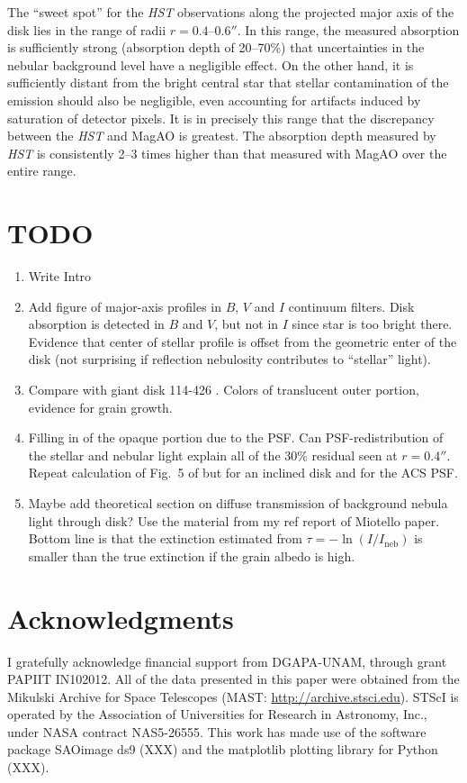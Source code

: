 \documentclass[oneside, 11pt]{article}
\begin{document}
The ``sweet spot'' for the \textit{HST} observations along the projected major axis of the disk lies in the range of radii \(r = 0.4\)--\(0.6''\).  In this range, the measured absorption is sufficiently strong (absorption depth of 20--70\%) that uncertainties in the nebular background level have a negligible effect.  On the other hand, it is sufficiently distant from the bright central star that stellar contamination of the emission should also be negligible, even accounting for artifacts induced by saturation of detector pixels.   It is in precisely this range that the discrepancy between the \textit{HST} and \hbox{MagAO} is greatest.  The absorption depth measured by \textit{HST} is consistently 2--3 times higher than that measured with MagAO over the entire range. 


\section*{TODO}
\label{sec:todo}

\begin{enumerate}
\item Write Intro
\item Add figure of major-axis profiles in \(B\), \(V\) and \(I\) continuum filters.  Disk absorption is detected in \(B\) and \(V\), but not in \(I\) since star is too bright there.  Evidence that center of stellar profile is offset from the geometric enter of the disk  (not surprising if reflection nebulosity contributes to ``stellar'' light). 
\item Compare with giant disk 114-426 \citep{2003ApJ...587L.109S, Miotello:2012a}.  Colors of translucent outer portion, evidence for grain growth. 
\item Filling in of the opaque portion due to the PSF.  Can PSF-redistribution of the stellar and nebular light explain all of the 30\% residual seen at \(r = 0.4''\).  Repeat calculation of Fig.~5 of \citeauthor{McCaughrean:1996a} but for an inclined disk and for the ACS PSF. 
\item Maybe add theoretical section on diffuse transmission of background nebula light through disk?   Use the material from my ref report of Miotello paper.  Bottom line is that the extinction estimated from \(\tau = - \ln (I / I_\mathrm{neb}) \) is smaller than the true extinction if the grain albedo is high. 
\end{enumerate}

\section*{Acknowledgments}
\label{sec:ack}
I gratefully acknowledge financial support from DGAPA-UNAM, through grant PAPIIT IN102012.
All of the data presented in this paper were obtained from the Mikulski Archive for Space Telescopes (MAST: \url{http://archive.stsci.edu}).  STScI is operated by the Association of Universities for Research in Astronomy, Inc., under NASA contract NAS5-26555.   This work has made use of the software package SAOimage ds9 (XXX) and the matplotlib plotting library for Python (XXX). 




\end{document}
